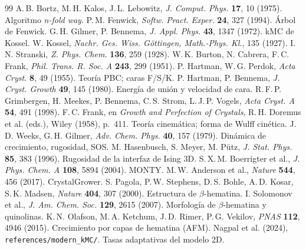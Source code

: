 \documentclass[11pt,a4paper]{article}
\newcommand{\code}[1]{\texttt{#1}}
\newcommand{\bh}{$\beta$-hematina}
\begin{document}
\begin{thebibliography}{99}
\small\setlength{\itemsep}{1pt}
 A.\,B. Bortz, M.\,H. Kalos, J.\,L. Lebowitz, \emph{J. Comput. Phys.} \textbf{17}, 10 (1975). Algoritmo \emph{n-fold way}.
 P.\,M. Fenwick, \emph{Softw. Pract. Exper.} \textbf{24}, 327 (1994). Árbol de Fenwick.
 G.\,H. Gilmer, P. Bennema, \emph{J. Appl. Phys.} \textbf{43}, 1347 (1972). kMC de Kossel.
 W. Kossel, \emph{Nachr. Ges. Wiss. Göttingen, Math.-Phys. Kl.}, 135 (1927).
 I.\,N. Stranski, \emph{Z. Phys. Chem.} \textbf{136}, 259 (1928).
 W.\,K. Burton, N. Cabrera, F.\,C. Frank, \emph{Phil. Trans. R. Soc. A} \textbf{243}, 299 (1951).
 P. Hartman, W.\,G. Perdok, \emph{Acta Cryst.} \textbf{8}, 49 (1955). Teoría PBC; caras F/S/K.
 P. Hartman, P. Bennema, \emph{J. Cryst. Growth} \textbf{49}, 145 (1980). Energía de unión y velocidad de cara.
 R.\,F.\,P. Grimbergen, H. Meekes, P. Bennema, C.\,S. Strom, L.\,J.\,P. Vogels, \emph{Acta Cryst. A} \textbf{54}, 491 (1998).
 F.\,C. Frank, en \emph{Growth and Perfection of Crystals}, R.\,H. Doremus et al. (eds.), Wiley (1958), p.~411. Teoría cinemática; forma de Wulff cinética.
 J.\,D. Weeks, G.\,H. Gilmer, \emph{Adv. Chem. Phys.} \textbf{40}, 157 (1979). Dinámica de crecimiento, rugosidad, SOS.
 M. Hasenbusch, S. Meyer, M. Pütz, \emph{J. Stat. Phys.} \textbf{85}, 383 (1996). Rugosidad de la interfaz de Ising 3D.
 S.\,X.\,M. Boerrigter et al., \emph{J. Phys. Chem. A} \textbf{108}, 5894 (2004). MONTY.
 M.\,W. Anderson et al., \emph{Nature} \textbf{544}, 456 (2017). CrystalGrower.
 S. Pagola, P.\,W. Stephens, D.\,S. Bohle, A.\,D. Kosar, S.\,K. Madsen, \emph{Nature} \textbf{404}, 307 (2000). Estructura de \bh{}.
 I. Solomonov et al., \emph{J. Am. Chem. Soc.} \textbf{129}, 2615 (2007). Morfología de \bh{} y quinolinas.
 K.\,N. Olafson, M.\,A. Ketchum, J.\,D. Rimer, P.\,G. Vekilov, \emph{PNAS} \textbf{112}, 4946 (2015). Crecimiento por capas de hematina (AFM).
 Nagpal et al. (2024), \code{references/modern\_kMC/}. Tasas adaptativas del modelo 2D.
\end{thebibliography}
\end{document}

